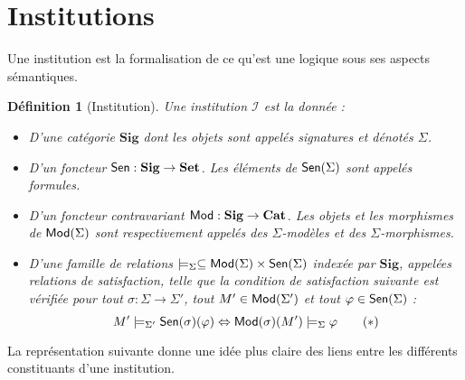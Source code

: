 \documentclass[11pt,a4paper]{article}
\newtheorem{defi}[theo]{Définition}
\newcommand{\ph}{\varphi}
\newcommand{\itemz}{\item[$\triangleright$]}
\newcommand{\gr}{\textbf}
\newcommand{\I}{\mathcal{I}}
\renewcommand{\iff}{\Leftrightarrow}
\newcommand{\info}[1]{\text{{\fontfamily{lmss}\selectfont #1}}}
\newcommand{\Mod}{\info{Mod}}
\newcommand{\Sen}{\info{Sen}}
\begin{document}
\section{Institutions}
Une institution est la formalisation de ce qu'est une logique sous ses aspects sémantiques. 
\begin{defi}[Institution]
Une institution $\I$ est la donnée :
\begin{itemize}
\setlength\itemsep{-0.3em}
\itemz D'une catégorie $\gr{Sig}$ dont les objets sont appelés signatures et dénotés $\Sigma$.
\itemz D'un foncteur $\Sen : \gr{Sig} \to \gr{Set}$. Les éléments de $\Sen (\Sigma)$ sont appelés formules.
\itemz D'un foncteur contravariant $\Mod : \gr{Sig} \to \gr{Cat}$. Les objets et les morphismes de $\Mod(\Sigma)$ sont respectivement appelés des $\Sigma$-modèles et des $\Sigma$-morphismes.
\itemz D'une famille de relations $\models_\Sigma \subseteq \Mod(\Sigma) \times \Sen(\Sigma)$ indexée par $\gr{Sig}$, appelées relations de satisfaction, telle que la condition de satisfaction suivante est vérifiée pour tout $\sigma : \Sigma \to \Sigma'$, tout $M' \in \Mod(\Sigma')$ et tout $\ph \in \Sen(\Sigma)$ :
\begin{equation} M' \models_{\Sigma'} \Sen(\sigma)(\ph) \iff \Mod(\sigma)(M') \models_{\Sigma} \ph \label{condsat} \tag{$\ast$} \end{equation}
\end{itemize}
\end{defi}
La représentation suivante donne une idée plus claire des liens entre les différents constituants d'une institution.
\begin{center}
\end{center}
\end{document}
